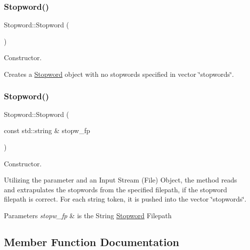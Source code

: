 \subsubsection{\texorpdfstring{Stopword()}{Stopword()}\hspace{0.1cm}{\footnotesize\ttfamily [1/2]}}
{\footnotesize\ttfamily Stopword\+::\+Stopword (\begin{DoxyParamCaption}{ }\end{DoxyParamCaption})\hspace{0.3cm}{\ttfamily [inline]}}



Constructor. 

Creates a \hyperlink{class_stopword}{Stopword} object with no stopwords specified in vector \char`\"{}stopwords\char`\"{}. \mbox{\label{class_stopword_a81af802f411344af42482f7ff2856027}} 
\subsubsection{\texorpdfstring{Stopword()}{Stopword()}\hspace{0.1cm}{\footnotesize\ttfamily [2/2]}}
{\footnotesize\ttfamily Stopword\+::\+Stopword (\begin{DoxyParamCaption}\item[{const std\+::string \&}]{stopw\+\_\+fp }\end{DoxyParamCaption})\hspace{0.3cm}{\ttfamily [explicit]}}



Constructor. 

Utilizing the parameter and an Input Stream (File) Object, the method reads and extrapulates the stopwords from the specified filepath, if the stopword filepath is correct. For each string token, it is pushed into the vector \char`\"{}stopwords\char`\"{}.


\begin{DoxyParams}{Parameters}
{\em stopw\+\_\+fp} & is the String \hyperlink{class_stopword}{Stopword} Filepath \\
\hline
\end{DoxyParams}


\subsection{Member Function Documentation}
\mbox{\label{class_stopword_abe5022f0267536ea0191a93047f8de42}} 
